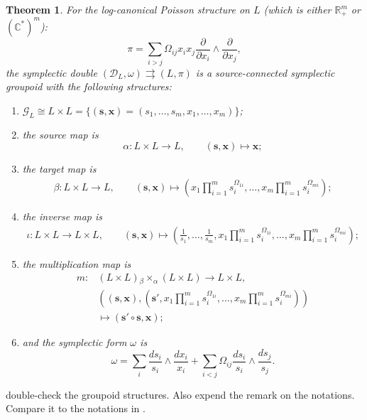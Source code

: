 \documentclass{amsart}
\newtheorem{theorem}{Theorem}[section]
\newcommand{\bfs}{\mathbf{s}}
\newcommand{\bfx}{\mathbf{x}}
\newcommand{\cG}{\mathcal{G}}
\newcommand{\cD}{\mathcal{D}}
\newcommand{\CC}{\mathbb{C}}
\newcommand{\RR}{\mathbb{R}}
\newcommand{\rra}{\rightrightarrows}
\begin{document}
\begin{theorem} \cite{MR2470108}
For the log-canonical Poisson structure on $L$ (which is either $\RR_+^m$ or $(\CC^*)^m$):
$$
	\pi = \sum_{i > j} \Omega_{ij} x_i x_j\frac{\partial}{\partial x_i} \wedge \frac{\partial}{\partial x_j},
$$
the symplectic double $(\cD_L, \omega) \rra (L, \pi)$ is a source-connected symplectic groupoid with the following structures:
	\begin{enumerate}
		\item $\cG_L \cong L \times L = \{(\bfs, \bfx) = (s_1, \ldots, s_m, x_1, \ldots, x_m)\}$;
		\item the source map is
			$$
				\alpha: L \times L \to L, \qquad (\bfs, \bfx) \mapsto \bfx;
			$$
		\item the target map is
			$$
				\begin{aligned}
				\beta:  L \times L \to L, \qquad (\bfs, \bfx) \mapsto \left(x_1 \prod_{i=1}^m s_i^{\Omega_{1i}}, \ldots, x_m \prod_{i=1}^m s_i^{\Omega_{mi}}\right);
				\end{aligned}
			$$
		\item the inverse map is
			$$
				\begin{aligned}
				\iota:  L \times L \to L \times L, \qquad (\bfs, \bfx) \mapsto \left(\frac{1}{s_1}, \ldots, \frac{1}{s_m}, x_1 \prod_{i=1}^m s_i^{\Omega_{1i}}, \ldots, x_m \prod_{i=1}^m s_i^{\Omega_{mi}}\right);
				\end{aligned}
			$$
		\item the multiplication map is
			$$
				\begin{aligned}
				m: & \left(L \times L\right) {_\beta \times_\alpha} \left(L \times L\right) \to L \times L, \\
				& \left((\bfs, \bfx), \left(\bfs', x_1 \prod_{i=1}^m s_i^{\Omega_{1i}}, \ldots, x_m \prod_{i=1}^m s_i^{\Omega_{mi}}\right)\right) \\
				& \mapsto (\bfs' \circ \bfs, \bfx );
				\end{aligned}
			$$
		\item and the symplectic form $\omega$ is
		$$
			\omega = \sum_{i} \frac{d s_i}{s_i} \wedge \frac{d x_i}{x_i} + \sum_{i < j} \Omega_{ij} \frac{d s_i}{s_i} \wedge \frac{d s_j}{s_j}.
		$$
	\end{enumerate}
\end{theorem}

{\color{red} double-check the groupoid structures. Also expend the remark on the notations. Compare it to the notations in \cite{MR2470108}.}
\end{document}
